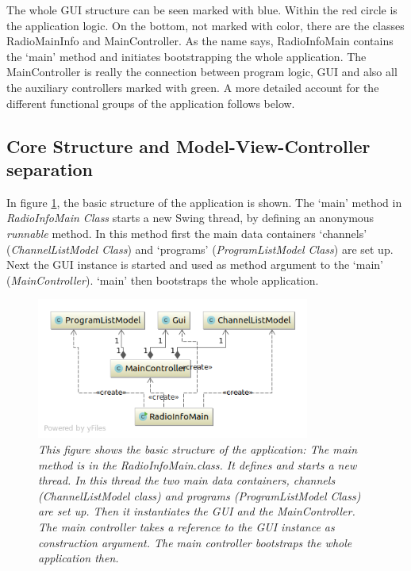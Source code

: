 \documentclass[a4paper,11pt,twoside]{article}
\begin{document}
The whole GUI structure can be seen marked with blue. Within the red circle is the application logic. On the bottom, not marked with color, there are the classes RadioMainInfo and MainController. As the name says, RadioInfoMain contains the `main' method and initiates bootstrapping the whole application. The MainController is really the connection between program logic, GUI and also all the auxiliary controllers marked with green. A more detailed account for the different functional groups of the application follows below.


\subsection{Core Structure and Model-View-Controller separation}
In figure \ref{fig:basic}, the basic structure of the application is shown. The `main' method in \textit{RadioInfoMain Class} starts a new Swing thread, by defining an anonymous \textit{runnable} method. In this method first the main data containers `channels' (\textit{ChannelListModel Class}) and `programs' (\textit{ProgramListModel Class}) are set up. Next the GUI instance is started and used as method argument to the `main' (\textit{MainController}). `main' then bootstraps the whole application. 


\begin{figure}[p]
  \centering
  \includegraphics[width=0.8\textwidth]{basicUML.png}
  \caption{\textit{This figure shows the basic structure of the application: The main method is in the RadioInfoMain.class. It defines and starts a new thread. In this thread the two main data containers, channels (ChannelListModel class) and programs (ProgramListModel Class) are set up. Then it instantiates the GUI and the MainController. The main controller takes a reference to the GUI instance as construction argument. The main controller bootstraps the whole application then.}}
  \label{fig:basic}
  \end{figure}
\end{document}
